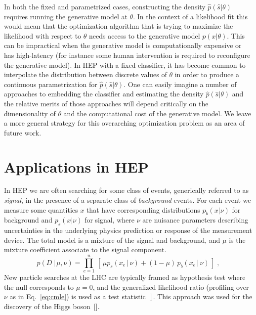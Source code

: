 \documentclass[aoas,preprint]{imsart}
\newcommand{\citek}[1]{[\cite{#1}]}
\numberwithin{equation}{section}
\theoremstyle{plain}
\begin{document}
In both the fixed and parametrized cases, constructing the density $\hat p(\hat s|\theta)$ requires running the generative model at $\theta$. In the context of a likelihood fit this would mean that the optimization algorithm that is trying to maximize the likelihood with respect to $\theta$ needs access to the generative model $p(x|\theta)$. This can be  impractical when the generative model is computationally expensive or has high-latency (for instance some human intervention is required to reconfigure the generative model).  In  HEP with a fixed classifier, it has become common  to interpolate the distribution between discrete values of $\theta$ in order to produce a continuous parametrization for $\hat p(\hat s | \theta)$. 
One can easily imagine a number of approaches to embedding the classifier and estimating the density $\hat p(\hat s|\theta)$ and the relative merits of those approaches will depend critically on the dimensionality of $\theta$ and the computational cost of the generative model. We leave a more general strategy for this overarching optimization problem as an area of future work.

\section{Applications in HEP}

In HEP we are often searching for some 
class of events, generically referred to as \textit{signal}, in the presence of a separate class 
of \textit{background} events.  For each event we measure some quantities $x$ that have corresponding distributions 
$p_b(x|\nu)$ for background and $p_s(x|\nu)$ for signal, where $\nu$ are nuisance parameters describing 
uncertainties in the underlying physics prediction or response of the measurement device. The 
total model is a mixture of the signal and background, and $\mu$ is the mixture coefficient associate 
to the signal component. 
\begin{equation}\label{eq:hepGen}
p( D \,|\, \mu, \nu) = \prod_{e=1}^n \, \left[\, \mu p_s( x_e \, |\,  \nu)  + (1-\mu)\, p_b( x_e \,|\, \nu) \,\right] \; ,
\end{equation}
New particle searches at the LHC are typically framed as hypothesis test where the null corresponds to $\mu=0$, and the
generalized likelihood ratio (profiling over $\nu$ as in Eq.~\ref{eq:cmle}) is used as a test statistic~\citek{Cowan:2010js}. This approach was used for the discovery of the Higgs boson~\citek{Aad:2012tfa,Chatrchyan:2012ufa}.
\end{document}
